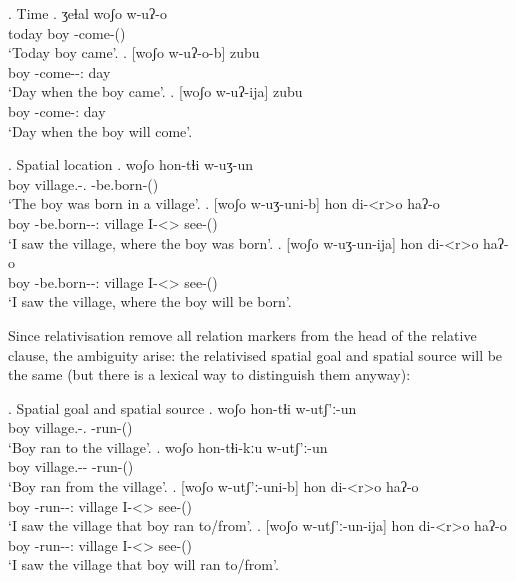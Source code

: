 \ex. Time
	\ag. ʒeɬal woʃo w-uʔ-o\\
			today {boy} {\M-come-\Pst(\Aor)}\\
			\glt `Today boy came'.	
	\bg. [woʃo w-uʔ-o-b] zubu\\
			{boy} {\M-come-\Pst-\Ptcp:\Pst} day\\
			\glt `Day when the boy came'.	
	\bg. [woʃo w-uʔ-ija] zubu\\
			{boy} {\M-come-\Ptcp:\Prae} day\\
			\glt `Day when the boy will come'.	

\ex. Spatial location
	\ag. woʃo hon-tɬi w-uʒ-un\\
			boy {village.\Obl-\Inter.\Ess} {\M-be.born-\Pst(\Aor)}\\
			\glt `The boy was born in a village'.
	\bg. [woʃo w-uʒ-uni-b] hon di-<r>o haʔ-o\\
			boy {\M-be.born-\Pst-\Ptcp:\Pst} village {I-<\Nans>\Aff} {see-\Pst(\Aor)}\\
			\glt `I saw the village, where the boy was born'.
	\bg. [woʃo w-uʒ-un-ija] hon di-<r>o haʔ-o\\
			boy {\M-be.born-\Npst-\Ptcp:\Prae} village {I-<\Nans>\Aff} {see-\Pst(\Aor)}\\
			\glt `I saw the village, where the boy will be born'.
			
Since relativisation remove all relation markers from the head of the relative clause, the ambiguity arise: the relativised spatial goal and spatial source will be the same (but there is a lexical way to distinguish them anyway):

\ex. Spatial goal and spatial source
	\ag. woʃo hon-tɬi w-utʃ'ː-un\\
			boy {village.\Obl-\Inter.\Lat} {\M-run-\Pst(\Aor)}\\
			\glt `Boy ran to the village'.
	\bg. woʃo hon-tɬi-kːu w-utʃ'ː-un\\
			boy {village.\Obl-\Inter-\Elat} {\M-run-\Pst(\Aor)}\\
			\glt `Boy ran from the village'.
	\bg. [woʃo w-utʃ'ː-uni-b] hon di-<r>o haʔ-o\\
			boy {\M-run-\Pst-\Ptcp:\Pst} village {I-<\Nans>\Aff} {see-\Pst(\Aor)}\\
			\glt `I saw the village that boy ran to/from'.
	\bg. [woʃo w-utʃ'ː-un-ija] hon di-<r>o haʔ-o\\
			boy {\M-run-\Npst-\Ptcp:\Prae} village {I-<\Nans>\Aff} {see-\Pst(\Aor)}\\
			\glt `I saw the village that boy will ran to/from'.


